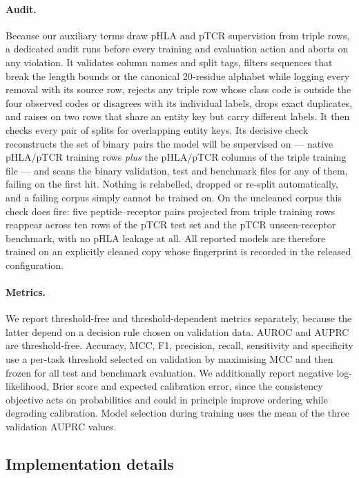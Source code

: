\documentclass[webpdf,modern,large,namedate]{oup-authoring-template}
\theoremstyle{thmstyleone}
\theoremstyle{thmstyletwo}
\theoremstyle{thmstylethree}
\newcommand{\PH}{pHLA}
\newcommand{\PT}{pTCR}
\begin{document}
\paragraph{Audit.}
Because our auxiliary terms draw \PH{} and \PT{} supervision from triple rows,
a dedicated audit runs before every training and evaluation action and aborts
on any violation. It validates column names and split tags, filters sequences
that break the length bounds or the canonical 20-residue alphabet while logging
every removal with its source row, rejects any triple row whose class code is
outside the four observed codes or disagrees with its individual labels, drops
exact duplicates, and raises on two rows that share an entity key but carry
different labels. It then checks every pair of splits for overlapping entity
keys. Its decisive check reconstructs the set of binary pairs the model will be
supervised on --- native \PH{}/\PT{} training rows \emph{plus} the \PH{}/\PT{}
columns of the triple training file --- and scans the binary validation, test
and benchmark files for any of them, failing on the first hit. Nothing is
relabelled, dropped or re-split automatically, and a failing corpus simply
cannot be trained on. On the uncleaned corpus this check does fire: five
peptide--receptor pairs projected from triple training rows reappear across ten
rows of the \PT{} test set and the \PT{} unseen-receptor benchmark, with no
\PH{} leakage at all. All reported models are therefore trained on an
explicitly cleaned copy whose fingerprint is recorded in the released
configuration.

\paragraph{Metrics.}
We report threshold-free and threshold-dependent metrics separately, because
the latter depend on a decision rule chosen on validation data. AUROC and AUPRC
are threshold-free. Accuracy, MCC, F1, precision, recall, sensitivity and
specificity use a per-task threshold selected on validation by maximising MCC
and then frozen for all test and benchmark evaluation. We additionally report
negative log-likelihood, Brier score and expected calibration error, since the
consistency objective acts on probabilities and could in principle improve
ordering while degrading calibration. Model selection during training uses the
mean of the three validation AUPRC values.

\subsection{Implementation details}\label{sec:method:impl}
\end{document}
